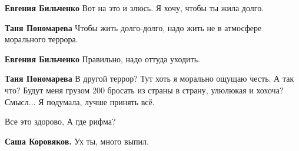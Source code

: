 \begin{itemize}
\begin{itemize}
\textbf{Евгения Бильченко} Вот на это и злюсь. Я хочу, чтобы ты жила долго.

 
\textbf{Таня Пономарева} Чтобы жить долго-долго, надо жить не в атмосфере морального террора.

 
\textbf{Евгения Бильченко} Правильно, надо оттуда уходить.

 
\textbf{Таня Пономарева} В другой террор? Тут хоть я морально ощущаю честь. А
так что? Будут меня грузом 200 бросать из страны в страну, улюлюкая и хохоча?
Смысл... Я подумала, лучше принять всё.
\end{itemize}

 
Все это здорово, А где рифма?

\begin{itemize}
 
\textbf{Саша Коровяков.} Ух ты, много выпил.

 

\end{itemize}
\end{itemize}
